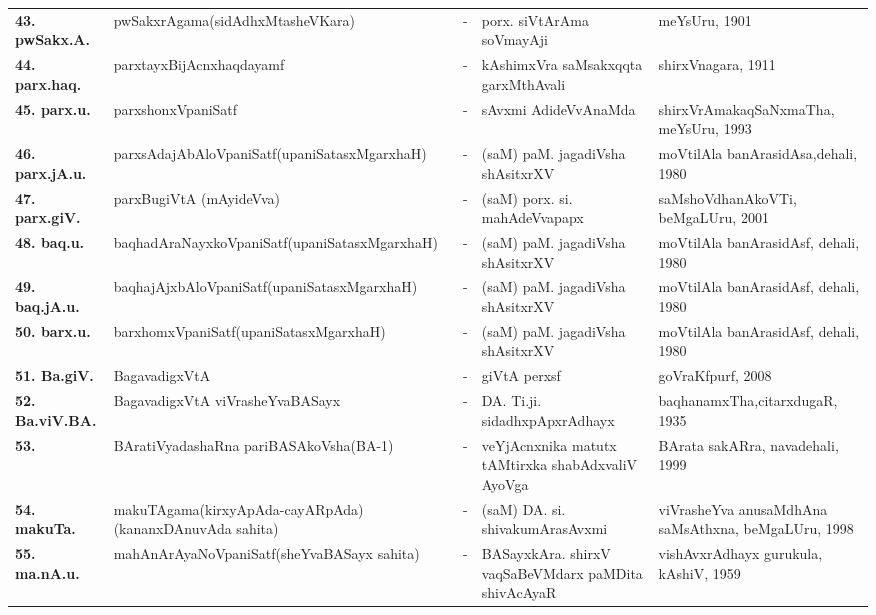 {\begin{longtable}{lp{5cm}cp{5cm}<{\raggedright}p{3cm}<{\raggedright}@{}}
{\bf 43. pwSakx.A.} & pwSakxrAgama\newline (sidAdhxMtasheVKara) &-& porx. siVtArAma soVmayAji & meYsUru, 1901\\
{\bf 44. parx.haq.} & parxtayxBijAcnxhaqdayamf &-& kAshimxVra saMsakxqqta garxMthAvali & shirxVnagara, 1911\\
{\bf 45. parx.u.} & parxshonxVpaniSatf &-& sAvxmi AdideVvAnaMda & shirxVrAmakaqSaNxmaTha, meYsUru, 1993\\
{\bf 46. parx.jA.u.} & parxsAdajAbAloVpaniSatf\newline (upaniSatasxMgarxhaH) &-& (saM) paM. jagadiVsha shAsitxrXV & moVtilAla banArasidAsa,\newline dehali, 1980\\
{\bf 47. parx.giV.} & parxBugiVtA (mAyideVva) &-& (saM) porx. si. mahAdeVvapapx & saMshoVdhanAkoVTi, beMgaLUru, 2001\\
{\bf 48. baq.u.} & baqhadAraNayxkoVpaniSatf\newline (upaniSatasxMgarxhaH) &-& (saM) paM. jagadiVsha shAsitxrXV & moVtilAla banArasidAsf, dehali, 1980\\
{\bf 49. baq.jA.u.} & baqhajAjxbAloVpaniSatf\newline (upaniSatasxMgarxhaH) &-& (saM) paM. jagadiVsha shAsitxrXV & moVtilAla banArasidAsf, dehali, 1980\\
{\bf 50. barx.u.} & barxhomxVpaniSatf\newline (upaniSatasxMgarxhaH) &-& (saM) paM. jagadiVsha shAsitxrXV & moVtilAla banArasidAsf, dehali, 1980\\
{\bf 51. Ba.giV.} & BagavadigxVtA &-& giVtA perxsf & goVraKfpurf, 2008\\
{\bf 52. Ba.viV.BA.} & BagavadigxVtA viVrasheYvaBASayx &-& DA. Ti.ji. sidadhxpApxrAdhayx & baqhanamxTha,\newline citarxdugaR, 1935\\
{\bf 53. } & BAratiVyadashaRna pariBASAkoVsha\newline (BA-1) &-& veYjAcnxnika matutx tAMtirxka shabAdxvaliV AyoVga & BArata sakARra, navadehali, 1999\\
{\bf 54. makuTa.} & makuTAgama\newline (kirxyApAda-cayAR\-pAda)\newline (kananxDAnuvAda sahita) &-& (saM) DA. si. shivakumArasAvxmi & viVrasheYva anusaMdhAna saMsAthxna, beMgaLUru, 1998\\
{\bf 55. ma.nA.u.} & mahAnArAyaNoVpaniSatf\newline (sheYvaBASayx sahita) &-& BASayxkAra. shirxV vaqSaBeVMdarx paMDita shivAcAyaR & vishAvxrAdhayx gurukula, kAshiV, 1959\\

\end{longtable}}
